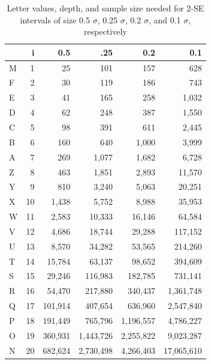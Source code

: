\documentclass[oneside]{article}
\begin{document}
\begin{table}
  \begin{center}
  \begin{tabular}{lrrrrr}
    \toprule
      &  i &    0.5 &     .25 &     0.2 &      0.1 \\
    \midrule
    M &  1 &     25 &     101 &     157 &      628 \\
    F &  2 &     30 &     119 &     186 &      743 \\
    E &  3 &     41 &     165 &     258 &     1,032 \\
    D &  4 &     62 &     248 &     387 &     1,550 \\
    C &  5 &     98 &     391 &     611 &     2,445 \\[3pt]
    B &  6 &    160 &     640 &    1,000 &     3,999 \\
    A &  7 &    269 &    1,077 &    1,682 &     6,728 \\
    Z &  8 &    463 &    1,851 &    2,893 &    11,570 \\
    Y &  9 &    810 &    3,240 &    5,063 &    20,251 \\
    X & 10 &   1,438 &    5,752 &    8,988 &    35,953  \\[3pt]
    W & 11 &   2,583 &   10,333 &   16,146 &    64,584 \\
    V & 12 &   4,686 &   18,744 &   29,288 &   117,152 \\
    U & 13 &   8,570 &   34,282 &   53,565 &   214,260 \\
    T & 14 &  15,784 &   63,137 &   98,652 &   394,609 \\
    S & 15 &  29,246 &  116,983 &  182,785 &   731,141  \\[3pt]
    R & 16 &  54,470 &  217,880 &  340,437 &  1,361,748 \\
    Q & 17 & 101,914 &  407,654 &  636,960 &  2,547,840 \\
    P & 18 & 191,449 &  765,796 & 1,196,557 &  4,786,227 \\
    O & 19 & 360,931 & 1,443,726 & 2,255,822 &  9,023,287 \\
    N & 20 & 682,624 & 2,730,498 & 4,266,403 & 17,065,610 \\
    \bottomrule
    
  \end{tabular}
  \end{center}
  \caption{Letter values, depth, and sample size needed for 2-SE intervals of size 0.5 $\sigma$, 0.25 $\sigma$, 0.2 $\sigma$, and 0.1 $\sigma$, respectively }
  \label{tbl:lv-error}
\end{table}
\end{document}
